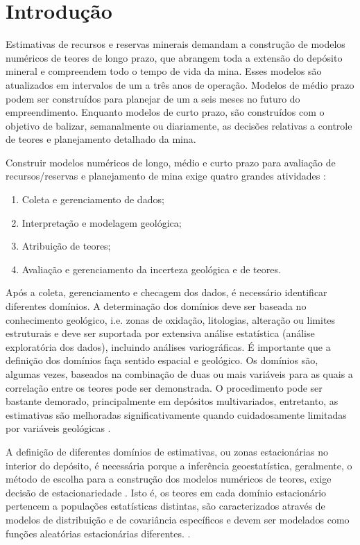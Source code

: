 \chapter{Introdução}

Estimativas de recursos e reservas minerais demandam a construção de modelos numéricos de teores de longo prazo, que abrangem toda a extensão do depósito mineral e compreendem todo o tempo de vida da mina. Esses modelos são atualizados em intervalos de um a três anos de operação. Modelos de médio prazo podem ser construídos para planejar de um a seis meses no futuro do empreendimento. Enquanto modelos de curto prazo, são construídos com o objetivo de balizar, semanalmente ou diariamente, as decisões relativas a controle de teores e planejamento detalhado da mina.

Construir modelos numéricos de longo, médio e curto prazo para avaliação de recursos/reservas e planejamento de mina exige quatro grandes atividades \cite{rossi2013mineral}:

\begin{enumerate}
\item Coleta e gerenciamento de dados;
\item Interpretação e modelagem geológica;
\item Atribuição de teores;
\item Avaliação e gerenciamento da incerteza geológica e de teores.
\end{enumerate}

Após a coleta, gerenciamento e checagem dos dados, é necessário identificar diferentes domínios. A determinação dos domínios deve ser baseada no conhecimento geológico, i.e. zonas de oxidação, litologias, alteração ou limites estruturais e deve ser suportada por extensiva análise estatística (análise exploratória dos dados), incluindo análises variográficas. É importante que a definição dos domínios faça sentido espacial e geológico. Os domínios são, algumas vezes, baseados na combinação de duas ou mais variáveis para as quais a correlação entre os teores pode ser demonstrada. O procedimento pode ser bastante demorado, principalmente em depósitos multivariados, entretanto, as estimativas são melhoradas significativamente quando cuidadosamente limitadas por variáveis geológicas \cite{rossi2013mineral}.

A definição de diferentes domínios de estimativas, ou zonas estacionárias no interior do depósito, é necessária porque a inferência geoestatística, geralmente, o método de escolha para a construção dos modelos numéricos de teores, exige decisão de estacionariedade \cite{mclennanstationarity}. Isto é, os teores em cada domínio estacionário pertencem a populações estatísticas distintas, são caracterizados através de modelos de distribuição e de covariância específicos e devem ser modelados como funções aleatórias estacionárias diferentes. \cite{journel1978mining}. 

